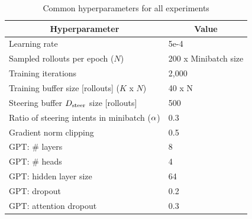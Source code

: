 \documentclass[nohyperref]{article}
\begin{document}
\begin{table}[h]
    \centering
    \caption{Common hyperparameters for all experiments }
    \label{table:common_hps}
        \begin{tabular}{l|l}
        \hline
        \multicolumn{1}{c|}{Hyperparameter}                    & \multicolumn{1}{c}{Value} \\ \hline
        Learning rate                                          & 5e-4                      \\
        Sampled rollouts per epoch ($N$)                       & 200 x Minibatch size      \\
        Training iterations                                    & 2,000                     \\
        Training buffer size [rollouts] ($K$ x $N$)            & 40 x N                    \\
        Steering buffer $D_{\mathrm{steer}}$ size [rollouts]      & 500                       \\
        Ratio of steering intents in minibatch ($\alpha$) & 0.3                       \\
        Gradient norm clipping                                 & 0.5                       \\
        GPT: \# layers                                         & 8                         \\
        GPT: \# heads                                          & 4                         \\
        GPT: hidden layer size                                 & 64                        \\
        GPT: dropout                                           & 0.2                       \\
        GPT: attention dropout                                 & 0.3                       \\
        \end{tabular}
\end{table}
\end{document}
